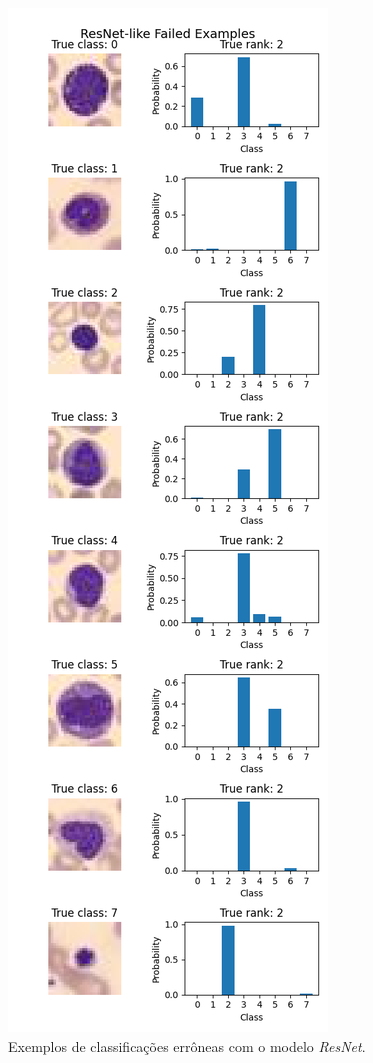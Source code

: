 \documentclass[final,5p]{elsarticle}
\numberwithin{equation}{section}
\begin{document}
\begin{figure}[H]
    \includegraphics[width=0.8\columnwidth]{ResNet_fails.png}
    \caption{Exemplos de classificações errôneas com o modelo \emph{ResNet}.}\label{fig:ErrosResNet}
\end{figure}
\end{document}
